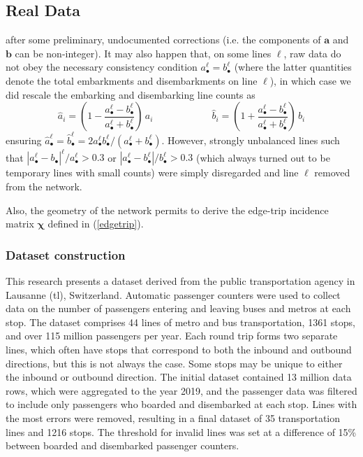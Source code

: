 \documentclass{bmcart}
\begin{document}
\subsection{Real Data}
\label{real_data}


after some preliminary, undocumented corrections (i.e. the components of $\mathbf{a}$ and $\mathbf{b}$ can be non-integer). It may also happen that, on some lines $\ell$,  raw data do not obey the necessary consistency condition  $a_\bullet^\ell=b_\bullet^\ell$ (where the latter quantities denote the total embarkments and disembarkments on line $\ell$), in which case we did rescale the embarking and disembarking line counts as 
\begin{displaymath}
	\hat{a}_i=(1-\frac{a_\bullet^\ell-b_\bullet^\ell}{a_\bullet^\ell+b_\bullet^\ell})\, a_i 
	\qquad\qquad\qquad
	\hat{b}_i=(1+\frac{a_\bullet^\ell-b_\bullet^\ell}{a_\bullet^\ell+b_\bullet^\ell})\,  b_i 
\end{displaymath}
ensuring $\hat{a}_\bullet^\ell=\hat{b}_\bullet^\ell=2a_\bullet^\ell b_\bullet^\ell/(a_\bullet^\ell+b_\bullet^\ell)$. However, strongly unbalanced lines such that  $|a_\bullet^\ell-b_\bullet|^\ell/a_\bullet^\ell > 0.3$ or $|a_\bullet^\ell-b_\bullet^\ell|/b_\bullet^\ell > 0.3$  (which always turned out to be temporary lines with small  counts) were simply disregarded and line $\ell$ removed from the network. 

Also, the geometry of the network permits to derive the edge-trip incidence matrix $\bm{\chi}$ defined in (\ref{edgetrip}). 

\subsubsection{Dataset construction}
This research presents a dataset derived from the public transportation agency in Lausanne (tl), Switzerland. Automatic passenger counters were used to collect data on the number of passengers entering and leaving buses and metros at each stop. The dataset comprises 44 lines of metro and bus transportation, 1361 stops, and over 115 million passengers per year. Each round trip forms two separate lines, which often have stops that correspond to both the inbound and outbound directions, but this is not always the case. Some stops may be unique to either the inbound or outbound direction. The initial dataset contained 13 million data rows, which were aggregated to the year 2019, and the passenger data was filtered to include only passengers who boarded and disembarked at each stop. Lines with the most errors were removed, resulting in a final dataset of 35 transportation lines and 1216 stops. The threshold for invalid lines was set at a difference of 15\% between boarded and disembarked passenger counters.
\end{document}

